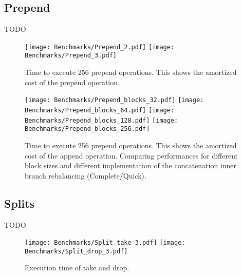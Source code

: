 \FloatBarrier

\subsection{Prepend}
\color{red} TODO \color{black}

\begin{figure}[h!]
  \centering
  \texttt{[image: Benchmarks/Prepend\_2.pdf]}
  \texttt{[image: Benchmarks/Prepend\_3.pdf]}
  \label{PrependBenchmarks}
  \caption{Time to execute 256 prepend operations. This shows the amortized cost of the prepend operation.}
\end{figure}

\begin{figure}[h!]
  \centering
  \texttt{[image: Benchmarks/Prepend\_blocks\_32.pdf]}
  \texttt{[image: Benchmarks/Prepend\_blocks\_64.pdf]}
  \texttt{[image: Benchmarks/Prepend\_blocks\_128.pdf]}
  \texttt{[image: Benchmarks/Prepend\_blocks\_256.pdf]}
  \label{PrependBenchmarks}
  \caption{Time to execute 256 prepend operations. This shows the amortized cost of the append operation. Comparing performances for different block sizes and different implementation of the concatenation inner branch rebalancing (Complete/Quick).}
\end{figure}

\FloatBarrier

\subsection{Splits}
\color{red} TODO \color{black}

\begin{figure}[h!]
  \centering
  \texttt{[image: Benchmarks/Split\_take\_3.pdf]}
  \texttt{[image: Benchmarks/Split\_drop\_3.pdf]}
  \label{SplitsBenchmarks}
  \caption{Execution time of take and drop.}
\end{figure}


